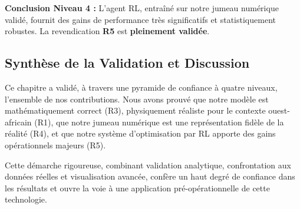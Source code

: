 \begin{table}[htbp]
    \centering
    \caption{Gains de performance : RL vs. Temps Fixe (moyenne sur 20 scénarios de test).}
    \label{tab:rl_performance_gains_revised}
\end{table}

\textbf{Conclusion Niveau 4 :} L'agent RL, entraîné sur notre jumeau numérique validé, fournit des gains de performance très significatifs et statistiquement robustes. La revendication \textbf{R5} est \textbf{pleinement validée}.

\subsection{Synthèse de la Validation et Discussion}
\label{sec:synthese_validation}

Ce chapitre a validé, à travers une pyramide de confiance à quatre niveaux, l'ensemble de nos contributions. Nous avons prouvé que notre modèle est mathématiquement correct (R3), physiquement réaliste pour le contexte ouest-africain (R1), que notre jumeau numérique est une représentation fidèle de la réalité (R4), et que notre système d'optimisation par RL apporte des gains opérationnels majeurs (R5).

Cette démarche rigoureuse, combinant validation analytique, confrontation aux données réelles et visualisation avancée, confère un haut degré de confiance dans les résultats et ouvre la voie à une application pré-opérationnelle de cette technologie.
